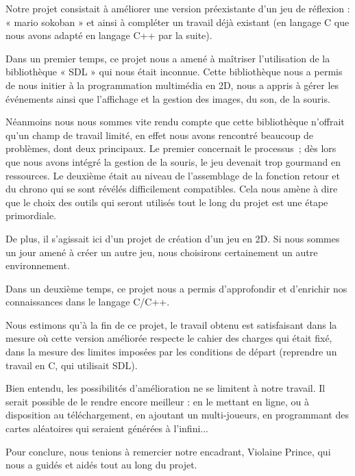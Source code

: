 \documentclass[english,11pt]{report}
\begin{document}
Notre projet consistait à améliorer une version préexistante d’un jeu de réflexion : « mario sokoban »  et ainsi à compléter un travail déjà existant (en langage C que nous avons adapté en langage C++ par la suite).\par
\vspace{0.2cm}
Dans un premier temps, ce projet nous a amené à maîtriser l’utilisation de la bibliothèque « SDL » qui nous était inconnue.  Cette bibliothèque nous a permis de nous initier à la programmation multimédia en 2D, nous a appris à gérer les événements ainsi que l’affichage et la gestion des images, du son, de la souris.\par
\vspace{0.2cm}
Néanmoins nous nous sommes vite rendu compte que cette bibliothèque n'offrait qu'un champ de travail limité, en effet nous avons rencontré beaucoup de problèmes, dont deux principaux. Le premier concernait le processus ; dès lors que nous avons intégré la gestion de la souris, le jeu devenait trop gourmand en ressources. Le deuxième était au niveau de l’assemblage de la fonction retour et du chrono qui se sont révélés difficilement compatibles. Cela nous amène à dire que le choix des outils qui seront utilisés tout le long du projet est une étape primordiale.\par
\vspace{0.2cm}
De plus, il s'agissait ici d'un projet de création d'un jeu en 2D. Si nous sommes un jour amené à créer un autre jeu, nous choisirons certainement un autre environnement.\par
\vspace{0.2cm}
Dans un deuxième temps, ce projet  nous a permis d’approfondir et d’enrichir nos connaissances dans le langage C/C++.\par
\vspace{0.2cm}
Nous estimons qu’à la fin de ce projet, le travail obtenu est satisfaisant dans la mesure où cette version améliorée respecte le cahier des charges qui était fixé, dans la mesure des limites imposées par les conditions de départ (reprendre un travail en C, qui utilisait SDL).\par
\vspace{0.2cm}
Bien entendu, les possibilités d'amélioration ne se limitent à notre travail. Il serait possible de le rendre encore meilleur : en le mettant en ligne, ou à disposition au téléchargement, en ajoutant un multi-joueurs, en programmant des cartes aléatoires qui seraient générées à l’infini...\par
\vspace{0.2cm}
Pour conclure, nous tenions à remercier notre encadrant, Violaine Prince, qui nous a guidés et aidés tout au long du projet.\par
\vspace{0.2cm}





\printbibliography
\end{document}
